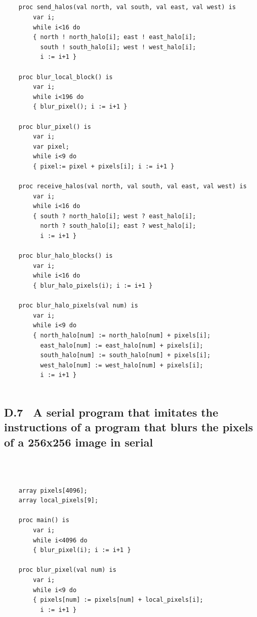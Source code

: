 \documentclass[a4paper, 12pt]{article}
\begin{document}
\begin{lstlisting}
    
    
    
    
    proc send_halos(val north, val south, val east, val west) is
        var i;
        while i<16 do 
        { north ! north_halo[i]; east ! east_halo[i];
          south ! south_halo[i]; west ! west_halo[i];
          i := i+1 }

    proc blur_local_block() is
        var i;
        while i<196 do
        { blur_pixel(); i := i+1 }

    proc blur_pixel() is
        var i;
        var pixel;
        while i<9 do
        { pixel:= pixel + pixels[i]; i := i+1 }

    proc receive_halos(val north, val south, val east, val west) is
        var i;
        while i<16 do
        { south ? north_halo[i]; west ? east_halo[i];
          north ? south_halo[i]; east ? west_halo[i];
          i := i+1 }

    proc blur_halo_blocks() is
        var i;
        while i<16 do
        { blur_halo_pixels(i); i := i+1 }

    proc blur_halo_pixels(val num) is
        var i;
        while i<9 do
        { north_halo[num] := north_halo[num] + pixels[i];
          east_halo[num] := east_halo[num] + pixels[i];
          south_halo[num] := south_halo[num] + pixels[i];
          west_halo[num] := west_halo[num] + pixels[i];
          i := i+1 }
          

\end{lstlisting}

\newpage
\subsection*{D.7 \ A serial program that imitates the instructions of a program that blurs the pixels of a 256x256 image in serial}
\ 
\begin{lstlisting}

    array pixels[4096];
    array local_pixels[9];

    proc main() is
        var i;
        while i<4096 do
        { blur_pixel(i); i := i+1 }

    proc blur_pixel(val num) is
        var i;
        while i<9 do
        { pixels[num] := pixels[num] + local_pixels[i];
          i := i+1 }
          

\end{lstlisting}
\end{document}
